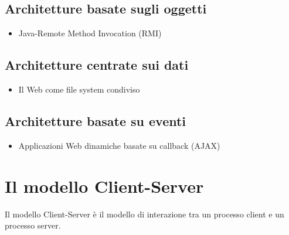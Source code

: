 \section{Architetture basate sugli oggetti}
\begin{itemize}
    \item Java-Remote Method Invocation (RMI)
\end{itemize}

\section{Architetture centrate sui dati}
\begin{itemize}
    \item Il Web come file system condiviso
\end{itemize}

\section{Architetture basate su eventi}
\begin{itemize}
    \item Applicazioni Web dinamiche basate su callback (AJAX)
\end{itemize}


\chapter{Il modello Client-Server}
Il modello Client-Server è il modello di interazione tra un processo client e un processo server.
